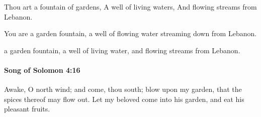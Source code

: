 			\begin{versebox}
					\item[BHS] 
					\item[LXX] 
					\item[ASV] Thou art a fountain of gardens, A well of living waters, And flowing streams from Lebanon.
					\item[NIV] You are a garden fountain, a well of flowing water streaming down from Lebanon.
					\item[NRSV] a garden fountain, a well of living water, and flowing streams from Lebanon.
			\end{versebox}

		\paragraph{Song of Solomon 4:16} %
			\label{SONGOFSOLOMON-4-16}

			Awake, O north wind; and come, thou south; blow upon my garden, that the spices thereof may flow out. Let my beloved come into his garden, and eat his pleasant fruits.

